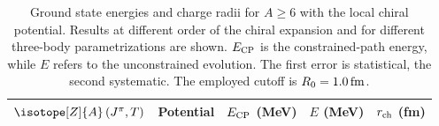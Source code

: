 \documentclass[aps,prc,twocolumn,superscriptaddress,floatfix]{revtex4-1}
\begin{document}
\begin{table}[htb]
\centering
\caption[]{Ground state energies and charge radii for $A\ge6$ with the local chiral potential. 
Results at different order of the chiral expansion and for different three-body parametrizations are shown. 
$E_{\rm CP}$ is the constrained-path energy, while $E$ refers to the unconstrained evolution.
The first error is statistical, the second systematic.
The employed cutoff is $R_0=1.0\,\rm fm$.}
\begin{tabular}{llccc}
\hline\hline
$\isotope[Z]{A}\,(J^\pi,T)$ & Potential & $E_{\rm CP}$ (MeV) & $E$ (MeV) & $r_{\rm ch}$ (fm) \\
\hline

\end{tabular}
\end{table}
\end{document}
